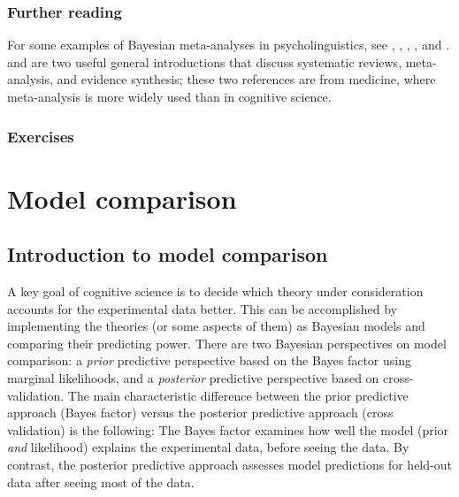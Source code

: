 \documentclass[12pt,]{krantz}
\theoremstyle{definition}
\theoremstyle{definition}
\theoremstyle{definition}
\theoremstyle{remark}
\begin{document}
\hypertarget{further-reading-5}{%
\section{Further reading}\label{further-reading-5}}

For some examples of Bayesian meta-analyses in psycholinguistics, see \citet{vasishthProcessingChineseRelative2013}, \citet{JaegerEngelmannVasishth2017},
\citet{NicenboimRoettgeretal}, \citet{nicenboim_vasishth_rosler_2020}, and \citet{BuerkiEtAl2020}. \citet{sutton2012evidence} and \citet{cochrane} are two useful general introductions that discuss systematic reviews, meta-analysis, and evidence synthesis; these two references are from medicine, where meta-analysis is more widely used than in cognitive science.

\hypertarget{exercises-4}{%
\section{Exercises}\label{exercises-4}}

\hypertarget{part-model-comparison}{%
\part{Model comparison}\label{part-model-comparison}}

\hypertarget{ch:comparison}{%
\chapter{Introduction to model comparison}\label{ch:comparison}}

A key goal of cognitive science is to decide which theory under consideration accounts for the experimental data better. This can be accomplished by implementing the theories (or some aspects of them) as Bayesian models and comparing their predicting power. There are two Bayesian perspectives on model comparison: a \emph{prior} predictive perspective based on the Bayes factor using marginal likelihoods, and a \emph{posterior} predictive perspective based on cross-validation. The main characteristic difference between the prior predictive approach (Bayes factor) versus the posterior predictive approach (cross validation) is the following: The Bayes factor examines how well the model (prior \emph{and} likelihood) explains the experimental data, before seeing the data. By contrast, the posterior predictive approach assesses model predictions for held-out data after seeing most of the data.
\end{document}
